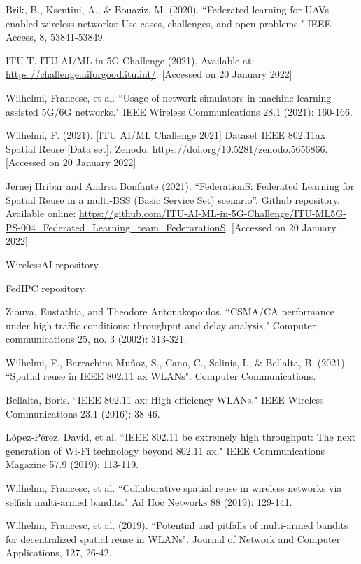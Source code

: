 \documentclass[10pt,a4paper,twocolumn]{article}
\newcommand{\ITUurl}[1]{\textcolor{blue}{\urlstyle{same}\url{#1}}}
\begin{document}
\begin{thebibliography}{9}
 Brik, B., Ksentini, A., \& Bouaziz, M. (2020). ``Federated learning for UAVs-enabled wireless networks: Use cases, challenges, and open problems." IEEE Access, 8, 53841-53849.

 ITU-T. ITU AI/ML in 5G Challenge (2021). Available at: {\ITUurl{https://challenge.aiforgood.itu.int/}}. [Accessed on 20 January 2022] 

 Wilhelmi, Francesc, et al. ``Usage of network simulators in machine-learning-assisted 5G/6G networks." IEEE Wireless Communications 28.1 (2021): 160-166.

 Wilhelmi, F. (2021). [ITU AI/ML Challenge 2021] Dataset IEEE 802.11ax Spatial Reuse [Data set]. Zenodo. https://doi.org/10.5281/zenodo.5656866. [Accessed on 20 January 2022] 

 Jernej Hribar and Andrea Bonfante (2021). ``FederationS: Federated Learning for Spatial Reuse in a multi-BSS (Basic Service Set) scenario''. Github repository. Available online: \ITUurl{https://github.com/ITU-AI-ML-in-5G-Challenge/ITU-ML5G-PS-004_Federated_Learning_team_FederarationS}. [Accessed on 20 January 2022] 

 WirelessAI repository.

 FedIPC repository.

 Ziouva, Eustathia, and Theodore Antonakopoulos. ``CSMA/CA performance under high traffic conditions: throughput and delay analysis." Computer communications 25, no. 3 (2002): 313-321.

 Wilhelmi, F., Barrachina-Muñoz, S., Cano, C., Selinis, I., \& Bellalta, B. (2021). ``Spatial reuse in IEEE 802.11 ax WLANs". Computer Communications.

 Bellalta, Boris. ``IEEE 802.11 ax: High-efficiency WLANs." IEEE Wireless Communications 23.1 (2016): 38-46.

 López-Pérez, David, et al. ``IEEE 802.11 be extremely high throughput: The next generation of Wi-Fi technology beyond 802.11 ax." IEEE Communications Magazine 57.9 (2019): 113-119.

 Wilhelmi, Francesc, et al. ``Collaborative spatial reuse in wireless networks via selfish multi-armed bandits." Ad Hoc Networks 88 (2019): 129-141.

 Wilhelmi, Francesc, et al. (2019). ``Potential and pitfalls of multi-armed bandits for decentralized spatial reuse in WLANs". Journal of Network and Computer Applications, 127, 26-42.


\end{thebibliography}
\end{document}
